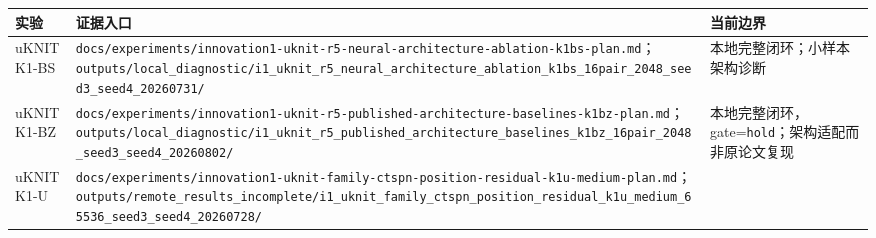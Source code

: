 \documentclass[
  a4paper,
  UTF8]{ctexart}
\begin{document}
\begin{longtable}[]{@{}lll@{}}
\toprule
\begin{minipage}[b]{0.30\columnwidth}\raggedright
实验\strut
\end{minipage} & \begin{minipage}[b]{0.30\columnwidth}\raggedright
证据入口\strut
\end{minipage} & \begin{minipage}[b]{0.30\columnwidth}\raggedright
当前边界\strut
\end{minipage}\tabularnewline
\midrule
\endhead
\begin{minipage}[t]{0.30\columnwidth}\raggedright
uKNIT K1-BS\strut
\end{minipage} & \begin{minipage}[t]{0.30\columnwidth}\raggedright
\nolinkurl{docs/experiments/innovation1-uknit-r5-neural-architecture-ablation-k1bs-plan.md}；\nolinkurl{outputs/local_diagnostic/i1_uknit_r5_neural_architecture_ablation_k1bs_16pair_2048_seed3_seed4_20260731/}\strut
\end{minipage} & \begin{minipage}[t]{0.30\columnwidth}\raggedright
本地完整闭环；小样本架构诊断\strut
\end{minipage}\tabularnewline
\begin{minipage}[t]{0.30\columnwidth}\raggedright
uKNIT K1-BZ\strut
\end{minipage} & \begin{minipage}[t]{0.30\columnwidth}\raggedright
\nolinkurl{docs/experiments/innovation1-uknit-r5-published-architecture-baselines-k1bz-plan.md}；\nolinkurl{outputs/local_diagnostic/i1_uknit_r5_published_architecture_baselines_k1bz_16pair_2048_seed3_seed4_20260802/}\strut
\end{minipage} & \begin{minipage}[t]{0.30\columnwidth}\raggedright
本地完整闭环，gate=\texttt{hold}；架构适配而非原论文复现\strut
\end{minipage}\tabularnewline
\begin{minipage}[t]{0.30\columnwidth}\raggedright
uKNIT K1-U\strut
\end{minipage} & \begin{minipage}[t]{0.30\columnwidth}\raggedright
\nolinkurl{docs/experiments/innovation1-uknit-family-ctspn-position-residual-k1u-medium-plan.md}；\nolinkurl{outputs/remote_results_incomplete/i1_uknit_family_ctspn_position_residual_k1u_medium_65536_seed3_seed4_20260728/}\strut
\end{minipage} & \begin{minipage}[t]{0.30\columnwidth}\raggedright

\end{minipage}
\end{longtable}
\end{document}
